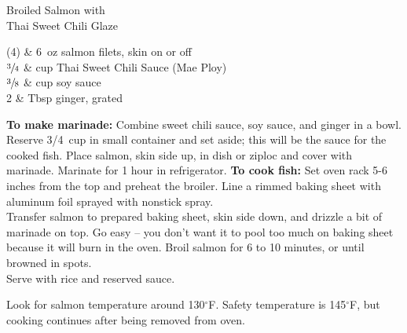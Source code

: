 \setHeadlines
{
}

\begin{recipe}
[ %
    source = Collegetown Bagels (in Ithaca) prepped meal,
]
{Broiled Salmon with \\Thai Sweet Chili Glaze}
    
    \ingredients
    {
		(4) & 6~oz salmon filets, skin on or off \\
		$\sfrac{3}{4}$ & cup Thai Sweet Chili Sauce (Mae Ploy) \\
		$\sfrac{3}{8}$ & cup soy sauce \\
		2 & Tbsp ginger, grated \\
    }
    
    \preparation
    {
        \step \textbf{To make marinade:} Combine sweet chili sauce, soy sauce, and ginger in a bowl. Reserve 3/4~cup in small container and set aside; this will be the sauce for the cooked fish.
		\step Place salmon, skin side up, in dish or ziploc and cover with marinade. Marinate for 1 hour in refrigerator.
		\step \textbf{To cook fish:} Set oven rack 5-6 inches from the top and preheat the broiler. 
		\step Line a rimmed baking sheet with aluminum foil sprayed with nonstick spray. \\
		\step Transfer salmon to prepared baking sheet, skin side down, and drizzle a bit of marinade on top. Go easy -- you don't want it to pool too much on baking sheet because it will burn in the oven. 
		\step Broil salmon for 6 to 10 minutes, or until browned in spots. \\
		\step Serve with rice and reserved sauce. 
    }
	
	\hint
	{
		Look for salmon temperature around 130$^{\circ}$F. Safety temperature is 145$^{\circ}$F, but cooking continues after being removed from oven. 
	}

\end{recipe}
